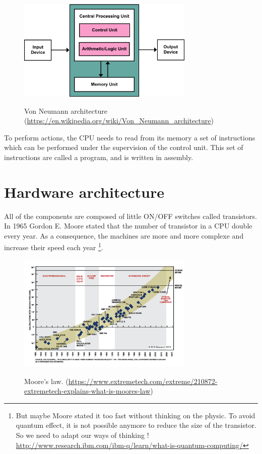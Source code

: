 \documentclass[runningheads,a4paper]{llncs}
\begin{document}
	\begin{figure}
	\centering
	\includegraphics[width=0.75\textwidth]{Figures/VonNewmanArchitecture}
	\\ \parbox{0.75\textwidth}{\caption[VonNewmanArchitecture]{Von Neumann architecture (\url{https://en.wikipedia.org/wiki/Von_Neumann_architecture}) }\label{fig:VonNewmanArchitecture}} 
	\end{figure}
	
	To perform actions, the CPU needs to read from its memory a set of instructions which can be performed under the supervision of the control unit. This set of instructions are called a program, and is written in assembly.
	
	\section{Hardware architecture}\label{theory}
	All of the components are composed of little ON/OFF switches called transistors. In 1965 Gordon E. Moore stated that the number of transistor in a CPU double every year. As a consequence, the machines are more and more complexe and increase their speed each year \footnote{But maybe Moore stated it too fast without thinking on the physic. To avoid quantum effect, it is not possible anymore to reduce the size of the transistor. So we need to adapt our ways of thinking ! \url{http://www.research.ibm.com/ibm-q/learn/what-is-quantum-computing/}}.
	
	\begin{figure}
		\centering
		\includegraphics[width=0.75\textwidth]{Figures/MooresLaw2.png}
		\\ \parbox{0.75\textwidth}{\caption[moore]{Moore's law. (\url{https://www.extremetech.com/extreme/210872-extremetech-explains-what-is-moores-law}) }\label{fig:moore}} 
	\end{figure}
	
\end{document}
